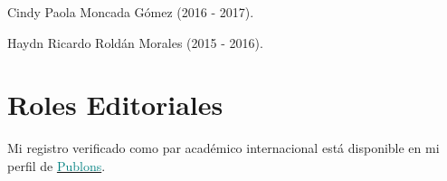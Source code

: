 \documentclass[11pt, a4paper]{awesome-cv}
\begin{document}
\begin{cventries}
{\begin{cvitems}
\item Cindy Paola Moncada Gómez (2016 - 2017).
\item Haydn Ricardo Roldán Morales (2015 - 2016).
\end{cvitems}}
\end{cventries}

\hypertarget{roles-editoriales}{%
\section{Roles Editoriales}\label{roles-editoriales}}

Mi registro verificado como par académico internacional está disponible
en mi perfil de
\href{https://publons.com/researcher/1333339/juan-david-leongomez/}{\textcolor{teal}{Publons}}.
\end{document}
